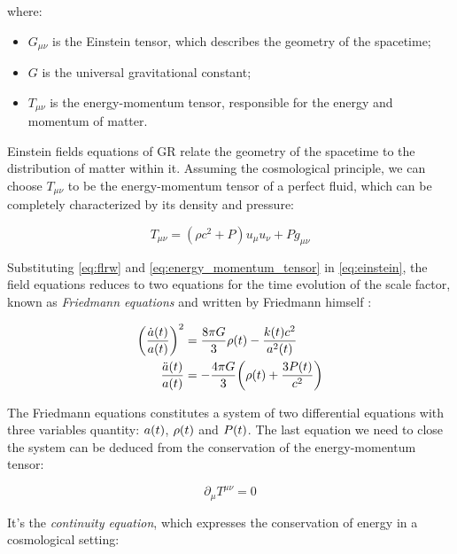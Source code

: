where:

\begin{itemize}
        \item $G_{\mu \nu}$ is the Einstein tensor, which describes the
        geometry of the spacetime;
        \item $G$ is the universal gravitational constant;
        \item $T_{\mu \nu}$ is the energy-momentum tensor, responsible for
        the energy and momentum of matter.
\end{itemize}

Einstein fields equations of GR relate the geometry of the spacetime to the
distribution of matter within it. Assuming the cosmological principle, we
can choose $T_{\mu \nu}$ to be the energy-momentum tensor of a perfect
fluid, which can be completely characterized by its density and pressure:

\begin{equation}
         T_{\mu \nu} = (\rho c^2 + P)u_\mu u_\nu + P g_{\mu \nu}
         \label{eq:energy_momentum_tensor}
\end{equation}

Substituting \autoref{eq:flrw} and \autoref{eq:energy_momentum_tensor} in
\autoref{eq:einstein}, the field equations reduces to two equations for the
time evolution of the scale factor, known as \emph{Friedmann equations} and
written by Friedmann himself \autocite{friedman1922krummung}:

\begin{align}
        \qty(\frac{\dot a\qty(t)}{a\qty(t)})^2 & = \frac{8\pi G}{3} \rho\qty(t)
        - \frac{k\qty(t) c^2}{a^2\qty(t)}
        \label{eq:friedmann_1} \\
        \frac{\ddot a\qty(t)}{a\qty(t)} & = -\frac{4\pi G}{3}
        \qty(\rho\qty(t) + \frac{3 P\qty(t)}{c^2})
        \label{eq:friedmann_2}
\end{align}

The Friedmann equations constitutes a system of two differential equations
with three variables quantity: $a\qty(t)$, $\rho\qty(t)$ and $P\qty(t)$.
The last equation we need to close the system can be deduced from the
conservation of the energy-momentum tensor:

\begin{equation}
        \partial_\mu T^{\mu \nu} = 0
\end{equation}

It's the \emph{continuity equation}, which expresses the conservation of energy in a
cosmological setting:

